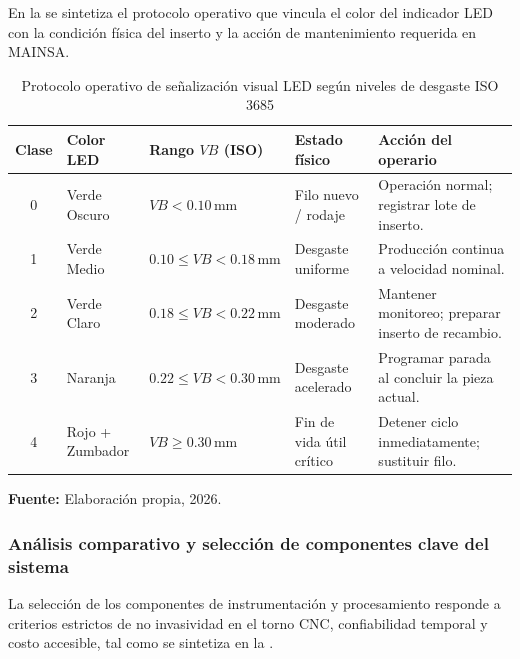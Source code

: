 En la  se sintetiza el protocolo operativo que vincula el color del indicador LED con la condición física del inserto y la acción de mantenimiento requerida en MAINSA.

\begin{table}[H]
\centering
\caption{Protocolo operativo de señalización visual LED según niveles de desgaste ISO 3685}\label{tab:protocolo_semaforo_led}
\vspace{2mm}
\small
\begin{tabular}{|c|p{2.2cm}|p{2.6cm}|p{3.2cm}|p{4.2cm}|}
\hline
\textbf{Clase} & \textbf{Color LED} & \textbf{Rango $VB$ (ISO)} & \textbf{Estado físico} & \textbf{Acción del operario} \\ \hline \hline
0 & Verde Oscuro & $VB < 0.10\,\text{mm}$ & Filo nuevo / rodaje & Operación normal; registrar lote de inserto. \\ \hline
1 & Verde Medio & $0.10 \le VB < 0.18\,\text{mm}$ & Desgaste uniforme & Producción continua a velocidad nominal. \\ \hline
2 & Verde Claro & $0.18 \le VB < 0.22\,\text{mm}$ & Desgaste moderado & Mantener monitoreo; preparar inserto de recambio. \\ \hline
3 & Naranja & $0.22 \le VB < 0.30\,\text{mm}$ & Desgaste acelerado & Programar parada al concluir la pieza actual. \\ \hline
4 & Rojo + Zumbador & $VB \ge 0.30\,\text{mm}$ & Fin de vida útil crítico & Detener ciclo inmediatamente; sustituir filo. \\ \hline
\end{tabular}
\par\vspace{2mm}
\footnotesize \textbf{Fuente:} Elaboración propia, 2026.
\end{table}

\subsubsection{Análisis comparativo y selección de componentes clave del sistema}

La selección de los componentes de instrumentación y procesamiento responde a criterios estrictos de no invasividad en el torno CNC, confiabilidad temporal y costo accesible, tal como se sintetiza en la .

